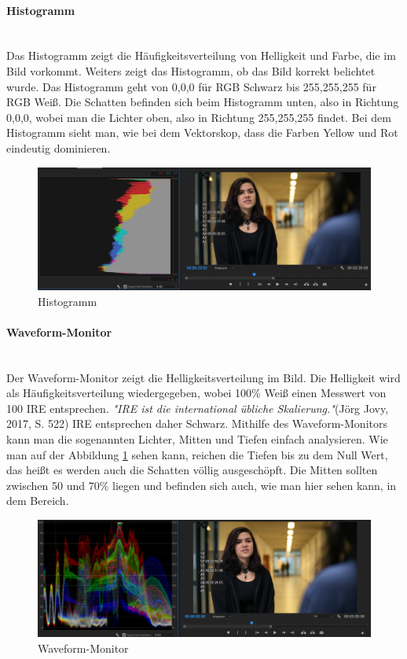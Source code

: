 \paragraph{Histogramm}
\leavevmode \\
Das Histogramm zeigt die Häufigkeitsverteilung von Helligkeit und Farbe, die im Bild vorkommt. Weiters zeigt das Histogramm, ob das Bild korrekt belichtet wurde. Das Histogramm geht von 0,0,0 für RGB Schwarz bis 255,255,255 für RGB Weiß. Die Schatten befinden sich beim Histogramm unten, also in Richtung 0,0,0, wobei man die Lichter oben, also in Richtung 255,255,255 findet.\citep{histogramm}\newline
Bei dem Histogramm sieht man, wie bei dem Vektorskop, dass die Farben Yellow und Rot eindeutig dominieren. 
\begin{figure}[H]
	\centering
	\includegraphics[width=1.0\textwidth]{abb21} 
	\caption{Histogramm}
\end{figure}
\paragraph{Waveform-Monitor}
\leavevmode \\
Der Waveform-Monitor zeigt die Helligkeitsverteilung im Bild. Die Helligkeit wird als Häufigkeitsverteilung wiedergegeben, wobei 100\% Weiß einen Messwert von 100 IRE entsprechen. \textit{"IRE ist die international übliche Skalierung."}(Jörg Jovy, 2017, S. 522) IRE entsprechen daher Schwarz. Mithilfe des Waveform-Monitors kann man die sogenannten Lichter, Mitten und Tiefen einfach analysieren.\citep{waveform}\newline
Wie man auf der Abbildung \ref{fig:abb20} sehen kann, reichen die Tiefen bis zu dem Null Wert, das heißt es werden auch die Schatten völlig ausgeschöpft. Die Mitten sollten zwischen 50 und 70\% liegen und befinden sich auch, wie man hier sehen kann, in dem Bereich.\citep{waveformZwei}
\begin{figure}[H]
	\centering
	\includegraphics[width=1.0\textwidth]{abb20} 
	\caption{Waveform-Monitor}\label{fig:abb20}
\end{figure}
